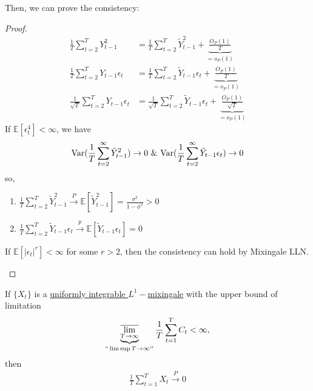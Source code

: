 \documentclass[11pt]{elegantbook}
\begin{document}
Then, we can prove the consistency:
\begin{proof}
    \begin{equation}
        \begin{aligned}
            \frac{1}{T}\sum_{t=2}^T Y_{t-1}^2&=\frac{1}{T}\sum_{t=2}^T \tilde{Y}_{t-1}^2+\underbrace{\frac{O_P(1)}{T}}_{=o_P(1)}\\
            \frac{1}{T}\sum_{t=2}^T Y_{t-1}\epsilon_t&=\frac{1}{T}\sum_{t=2}^T \tilde{Y}_{t-1}\epsilon_t+\underbrace{\frac{O_P(1)}{T}}_{=o_P(1)}\\
            \frac{1}{\sqrt{T}}\sum_{t=2}^T Y_{t-1}\epsilon_t&=\frac{1}{\sqrt{T}}\sum_{t=2}^T \tilde{Y}_{t-1}\epsilon_t+\underbrace{\frac{O_P(1)}{\sqrt{T}}}_{=o_P(1)}
        \end{aligned}
        \nonumber
    \end{equation}
    If $\mathbb{E}[\epsilon_t^4]<\infty$, we have
    \begin{equation}
        \begin{aligned}
            \textnormal{Var}(\frac{1}{T}\sum_{t=2}^\infty\tilde{Y}_{t-1}^2) \rightarrow 0\ \& \ \textnormal{Var}(\frac{1}{T}\sum_{t=2}^\infty\tilde{Y}_{t-1}\epsilon_t) \rightarrow 0
        \end{aligned}
        \nonumber
    \end{equation}
    so,
    \begin{enumerate}
        \item $\frac{1}{T}\sum_{t=2}^T \tilde{Y}_{t-1}^2 \stackrel{P}{\longrightarrow} \mathbb{E}[\tilde{Y}_{t-1}^2]=\frac{\sigma^2}{1-\phi^2}>0$
        \item $\frac{1}{T}\sum_{t=2}^T \tilde{Y}_{t-1}\epsilon_t \stackrel{p}{\rightarrow} \mathbb{E}[\tilde{Y}_{t-1}\epsilon_t]=0$
    \end{enumerate}
    \begin{note}
        If $\mathbb{E}[|\epsilon_t|^r]<\infty$ for some $r>2$, then the consistency can hold by Mixingale LLN.
    \end{note}
\end{proof}
\begin{theorem}
    If $\{X_t\}$ is a \underline{uniformly integrable $L^1-$mixingale} with the upper bound of limitation
    \begin{equation}
        \begin{aligned}
            \underbrace{\overline{\lim_{T \rightarrow \infty}}}_{``\lim\sup T \rightarrow \infty''}\frac{1}{T}\sum_{t=1}^T C_t<\infty,
        \end{aligned}
        \nonumber
    \end{equation}
    then
    \begin{equation}
        \begin{aligned}
            \frac{1}{T}\sum_{t=1}^T X_t \stackrel{P}{\longrightarrow} 0
        \end{aligned}
        \nonumber
    \end{equation}
\end{theorem}
\end{document}

